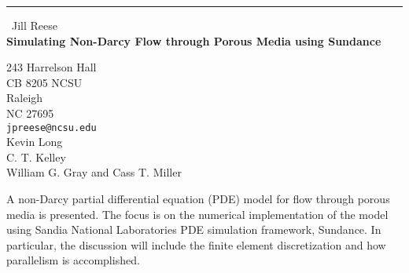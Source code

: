 \documentclass{report}
\begin{document}
\begin{center}
\rule{6in}{1pt} \
{\large Jill Reese \\
{\bf Simulating Non-Darcy Flow through Porous Media using Sundance}}

243 Harrelson Hall \\ CB 8205 NCSU \\ Raleigh \\ NC 27695
\\
{\tt jpreese@ncsu.edu}\\
Kevin Long\\
C. T. Kelley\\
	William G. Gray and Cass T. Miller\end{center}

A non-Darcy partial differential equation (PDE) model for flow through
porous media is presented. The focus is on the numerical implementation
of the model using Sandia National Laboratories PDE simulation framework,
Sundance. In particular, the discussion will include the finite element
discretization and how parallelism is accomplished.
\end{document}
